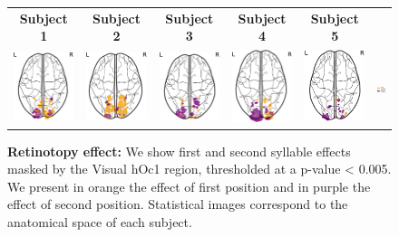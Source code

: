 \begin{figure}[ht]
\scriptsize
\vspace{5ex}
\hspace{-4ex}
\begin{tabular}{cccccl}
\textbf{\Large Subject 1} & \textbf{\Large Subject 2} & \textbf{\Large Subject 3} & \textbf{\Large Subject 4} & \textbf{\Large Subject 5} & {}\\
{\includegraphics[width=.14\linewidth]{figures/part_II/retinotopy_01.pdf}}
\hspace{1ex}
&{\includegraphics[width=.14\linewidth]{figures/part_II/retinotopy_03.pdf}}
\hspace{1ex}
&{\includegraphics[width=.14\linewidth]{figures/part_II/retinotopy_04.pdf}}
\hspace{1ex}
&{\includegraphics[width=.14\linewidth]{figures/part_II/retinotopy_05.pdf}}
\hspace{1ex}
&{\includegraphics[width=.14\linewidth]{figures/part_II/retinotopy_06.pdf}}
\hspace{1ex}
&{\includegraphics[width=.12\linewidth]{figures/part_II/retinotopy_legend.pdf}}
\hspace{-1ex} \\
\end{tabular}
\vspace{3ex}
\caption{\textbf{Retinotopy effect:} We show first and second syllable effects masked by the Visual hOc1 region, thresholded at a p-value < 0.005.
We present in orange the effect of first position and in purple the effect of second position. Statistical images correspond to the anatomical space of each subject.}
\label{fig:retinotopy}
\end{figure}


